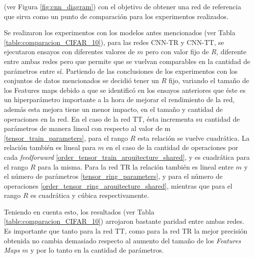 \documentclass[spanish]{article}
\theoremstyle{definition}
\theoremstyle{remark}
\numberwithin{equation}{section}
\numberwithin{equation}{section} %
\begin{document}
(ver Figura \ref{fig:cnn_diagram}) con el objetivo de obtener una red de referencia que sirva como un punto de comparación para los experimentos realizados. 
\par 
Se  realizaron los experimentos con los modelos antes mencionados  (ver Tabla \ref{table:comparacion_CIFAR_10}), para las redes CNN-TR y CNN-TT, se ejecutaron ensayos con diferentes valores de $m$ pero con valor fijo de $R$, diferente entre ambas redes pero que permite que se vuelvan comparables en la cantidad de parámetros entre sí. Partiendo de las conclusiones de los experimentos con los conjuntos de datos mencionados se decidió tener un $R$ fijo, variando el tamaño de los Features maps debido a que se identificó en los ensayos anteriores que éste es un hiperparámetro importante a la hora de mejorar el rendimiento de la red, además esta mejora tiene un menor impacto, en el tamaño y cantidad de operaciones en la red. En el caso de la red TT, ésta incrementa su cantidad de parámetros de manera lineal con respecto al valor de m \eqref{tensor_train_parameters}, para el rango $R$ esta relación se vuelve cuadrática. La relación también es lineal para $m$ en el caso de la cantidad de operaciones por cada \textit{feedforward} \eqref{order_tensor_train_arquitecture_shared}, y es cuadrática para el rango $R$ para la misma. Para la red TR la relación también es lineal entre $m$ y el número de parámetros \eqref{tensor_ring_parameters}, y para el número de operaciones \eqref{order_tensor_ring_arquitecture_shared}, mientras que para el rango $R$ es cuadrática y cúbica respectivamente. 
\par 
Teniendo en cuenta esto, los resultados (ver Tabla \ref{table:comparacion_CIFAR_10}) arrojaron bastante paridad entre ambas redes. Es importante que tanto para la red TT, como para la red TR la mejor precisión obtenida no cambia demasiado respecto al aumento del tamaño de los \textit{Features Maps} $m$ y por lo tanto en la cantidad de parámetros.     
\par 
\end{document}
